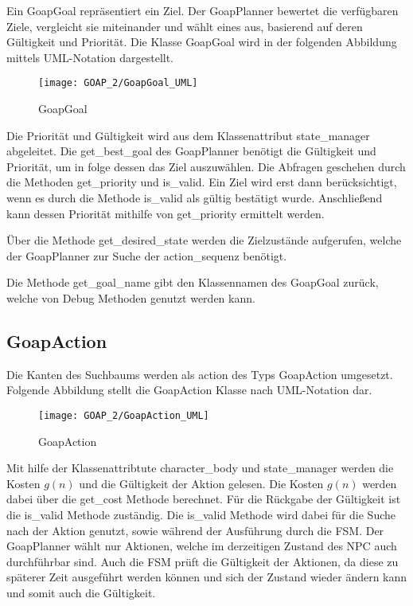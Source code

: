 Ein GoapGoal repräsentiert ein Ziel. Der GoapPlanner bewertet die verfügbaren Ziele, vergleicht sie miteinander und wählt eines aus, basierend auf deren Gültigkeit und Priorität. Die Klasse GoapGoal wird in der folgenden Abbildung mittels UML-Notation dargestellt.

\begin{figure}[h]
  \centering
  \texttt{[image: GOAP\_2/GoapGoal\_UML]}
	\captionsetup{justification=justified, format=plain}
  \caption{GoapGoal}
  \label{GoapGoal}
\end{figure}

Die Priorität und Gültigkeit wird aus dem Klassenattribut state\_manager abgeleitet. Die get\_best\_goal des GoapPlanner benötigt die Gültigkeit und Priorität, um in folge dessen das Ziel auszuwählen. Die Abfragen geschehen durch die Methoden get\_priority und is\_valid. Ein Ziel wird erst dann berücksichtigt, wenn es durch die Methode is\_valid als gültig bestätigt wurde. Anschließend kann dessen Priorität mithilfe von get\_priority ermittelt werden. 

Über die Methode get\_desired\_state werden die Zielzustände aufgerufen, welche der GoapPlanner zur Suche der action\_sequenz benötigt. 

Die Methode get\_goal\_name gibt den Klassennamen des GoapGoal zurück, welche von Debug Methoden genutzt werden kann.


\subsection{GoapAction}

Die Kanten des Suchbaums werden als action des Typs GoapAction umgesetzt. Folgende Abbildung stellt die GoapAction Klasse nach UML-Notation dar.

\begin{figure}[h]
  \centering
  \texttt{[image: GOAP\_2/GoapAction\_UML]}
	\captionsetup{justification=justified, format=plain}
  \caption{GoapAction}
  \label{GoapAction}
\end{figure}

Mit hilfe der Klassenattribtute character\_body und state\_manager werden die Kosten $g(n)$ und die Gültigkeit der Aktion gelesen. Die Kosten $g(n)$ werden dabei über die get\_cost Methode berechnet. Für die Rückgabe der Gültigkeit ist die is\_valid Methode zuständig. Die is\_valid Methode wird dabei für die Suche nach der Aktion genutzt, sowie während der Ausführung durch die FSM. Der GoapPlanner wählt nur Aktionen, welche im derzeitigen Zustand des NPC auch durchführbar sind. Auch die FSM prüft die Gültigkeit der Aktionen, da diese zu späterer Zeit ausgeführt werden können und sich der Zustand wieder ändern kann und somit auch die Gültigkeit.

